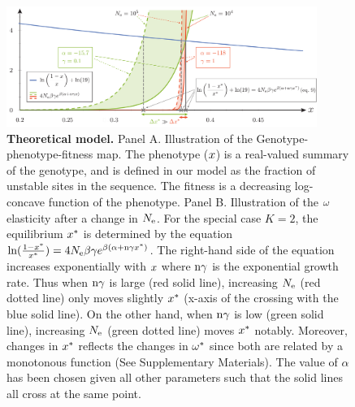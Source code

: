 \documentclass{article}
\begin{document}
\begin{figure}[htb!]
 \begin{mdframed}
  \centering
  \includegraphics[width=0.9\textwidth, page=1] {artworks/theoretical.pdf}
  \caption{
   \textbf{Theoretical model.}
   Panel A. Illustration of the Genotype-phenotype-fitness map. The phenotype ($x$) is a real-valued summary of the genotype, and is defined in our model as the fraction of unstable sites in the sequence. The fitness is a decreasing log-concave function of the phenotype.
   Panel B. Illustration of the $\omega$ elasticity after a change in $N_{\mathrm{e}}$.
   For the special case $K=2$, the equilibrium $x^{*}$ is determined by the equation $\ln(\frac{1 - x^{*}}{x^{*}})=4N_{\mathrm{e}} \beta \gamma e^{\beta (\alpha + \text{n} \gamma x^{*})}$. The right-hand side of the equation increases exponentially with $x$ where $\text{n} \gamma$ is the exponential growth rate. Thus when $\text{n} \gamma$ is large (red solid line), increasing $N_{\mathrm{e}}$ (red dotted line) only moves slightly $x^{*}$ (x-axis of the crossing with the blue solid line). On the other hand, when $\text{n} \gamma$ is low (green solid line), increasing $N_{\mathrm{e}}$ (green dotted line) moves $x^{*}$ notably. Moreover, changes in $x^{*}$ reflects the changes in $\omega^{*}$ since both are related by a monotonous function (See Supplementary Materials). The value of $\alpha$ has been chosen given all other parameters such that the solid lines all cross at the same point.
  }
  \label{fig:NeChangeInfluence}
 \end{mdframed}
\end{figure}
\end{document}
